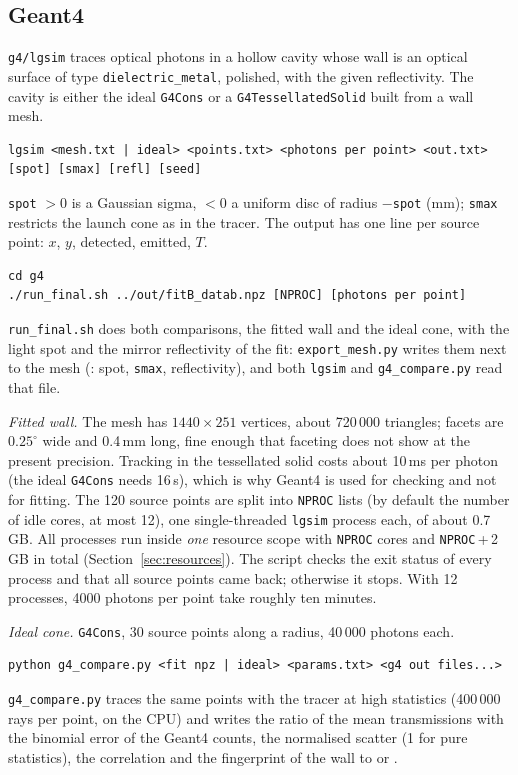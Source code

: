 \documentclass[11pt,a4paper]{article}
\newcommand{\code}[1]{\texttt{#1}}
\begin{document}
\subsection{Geant4}

\code{g4/lgsim} traces optical photons in a hollow cavity whose wall is an optical surface of type
\code{dielectric\_metal}, polished, with the given reflectivity. The cavity is either the ideal
\code{G4Cons} or a \code{G4TessellatedSolid} built from a wall mesh.
\begin{lstlisting}
lgsim <mesh.txt | ideal> <points.txt> <photons per point> <out.txt> [spot] [smax] [refl] [seed]
\end{lstlisting}
\code{spot} $>0$ is a Gaussian sigma, $<0$ a uniform disc of radius $-$\code{spot} (mm); \code{smax}
restricts the launch cone as in the tracer. The output has one line per source point:
$x$, $y$, detected, emitted, $T$.

\begin{lstlisting}
cd g4
./run_final.sh ../out/fitB_datab.npz [NPROC] [photons per point]
\end{lstlisting}
\code{run\_final.sh} does both comparisons, the fitted wall and the ideal cone, with the light spot
and the mirror reflectivity of the fit: \code{export\_mesh.py} writes them next to the mesh
(: spot, \code{smax}, reflectivity), and both \code{lgsim} and
\code{g4\_compare.py} read that file.

\emph{Fitted wall.} The mesh has $1440\times251$ vertices, about 720\,000 triangles; facets are
$0.25^\circ$ wide and 0.4\,mm long, fine enough that faceting does not show at the present precision.
Tracking in the tessellated solid costs about 10\,ms per photon (the ideal \code{G4Cons} needs
16\,\textmu s), which is why Geant4 is used for checking and not for fitting. The 120 source points
are split into \code{NPROC} lists (by default the number of idle cores, at most 12), one
single-threaded \code{lgsim} process each, of about 0.7\,GB. All processes run inside \emph{one}
resource scope with \code{NPROC} cores and \code{NPROC}\,+\,2\,GB in total
(Section~\ref{sec:resources}). The script checks the exit status of every process and that all source
points came back; otherwise it stops. With 12 processes, 4000 photons per point take roughly ten
minutes.

\emph{Ideal cone.} \code{G4Cons}, 30 source points along a radius, 40\,000 photons each.

\begin{lstlisting}
python g4_compare.py <fit npz | ideal> <params.txt> <g4 out files...>
\end{lstlisting}
\code{g4\_compare.py} traces the same points with the tracer at high statistics (400\,000 rays per
point, on the CPU) and writes the ratio of the mean transmissions with the binomial error of the
Geant4 counts, the normalised scatter (1 for pure statistics), the correlation and the fingerprint of
the wall to  or .
\end{document}
